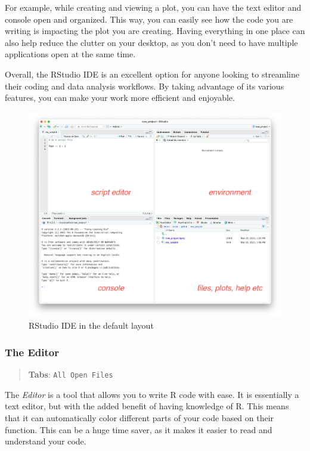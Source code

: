 \documentclass[
]{book}
\begin{document}
For example, while creating and viewing a plot, you can have the text editor and console open and organized. This way, you can easily see how the code you are writing is impacting the plot you are creating. Having everything in one place can also help reduce the clutter on your desktop, as you don't need to have multiple applications open at the same time.

Overall, the RStudio IDE is an excellent option for anyone looking to streamline their coding and data analysis workflows. By taking advantage of its various features, you can make your work more efficient and enjoyable.

\begin{figure}
\includegraphics[width=19.19in]{images/02_021_rstudio_panes} \caption{\label{fig:2021}RStudio IDE in the default layout}\label{fig:2021}
\end{figure}

\hypertarget{the-editor}{%
\subsubsection*{The Editor}\label{the-editor}}

\begin{quote}
\textbf{Tabs}: \texttt{All\ Open\ Files}
\end{quote}

The \emph{Editor} is a tool that allows you to write R code with ease. It is essentially a text editor, but with the added benefit of having knowledge of R. This means that it can automatically color different parts of your code based on their function. This can be a huge time saver, as it makes it easier to read and understand your code.
\end{document}
